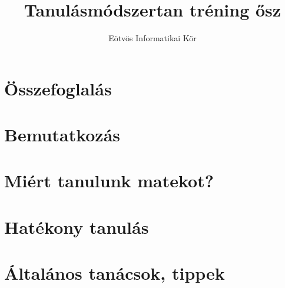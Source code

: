 \documentclass[12pt]{article}
\title{Tanulásmódszertan tréning ősz}
\author{Eötvös Informatikai Kör}
\date{ }
\begin{document}
\section{Összefoglalás}


\section{Bemutatkozás}


\section{Miért tanulunk matekot?}


\section{Hatékony tanulás}


\section{Általános tanácsok, tippek}

\end{document}
